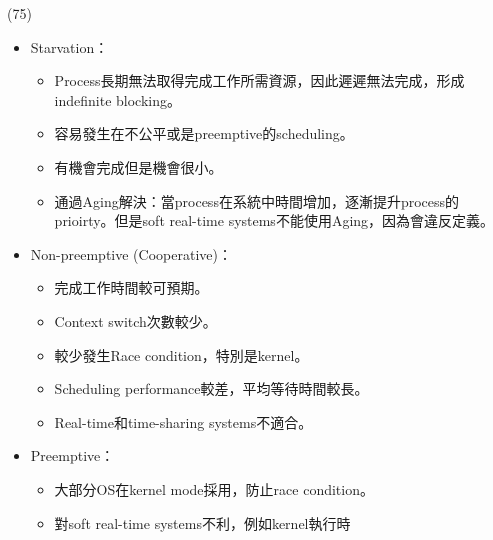 \item \begin{theorem}{(75)} \quad\quad \begin{itemize}
        \item Starvation：\begin{itemize}
            \item Process長期無法取得完成工作所需資源，因此遲遲無法完成，形成indefinite blocking。
            \item 容易發生在不公平或是preemptive的scheduling。
            \item 有機會完成但是機會很小。
            \item 通過Aging解決：當process在系統中時間增加，逐漸提升process的prioirty。但是soft real-time systems不能使用Aging，因為會違反定義。
        \end{itemize}
        \item Non-preemptive (Cooperative)：\begin{itemize}
            \item 完成工作時間較可預期。
            \item Context switch次數較少。
            \item 較少發生Race condition，特別是kernel。
            \item Scheduling performance較差，平均等待時間較長。
            \item Real-time和time-sharing systems不適合。
        \end{itemize}
        \item Preemptive：\begin{itemize}
            \item 大部分OS在kernel mode採用，防止race condition。
            \item 對soft real-time systems不利，例如kernel執行時
        \end{itemize}
    \end{itemize}
\end{theorem}


